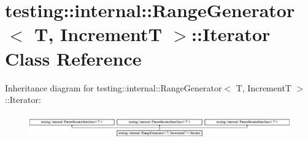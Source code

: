 \hypertarget{classtesting_1_1internal_1_1_range_generator_1_1_iterator}{}\section{testing\+::internal\+::Range\+Generator$<$ T, IncrementT $>$\+::Iterator Class Reference}
\label{classtesting_1_1internal_1_1_range_generator_1_1_iterator}
Inheritance diagram for testing\+::internal\+::Range\+Generator$<$ T, IncrementT $>$\+::Iterator\+:\begin{figure}[H]
\begin{center}
\leavevmode
\includegraphics[height=1.063628cm]{d0/d87/classtesting_1_1internal_1_1_range_generator_1_1_iterator}
\end{center}
\end{figure}
